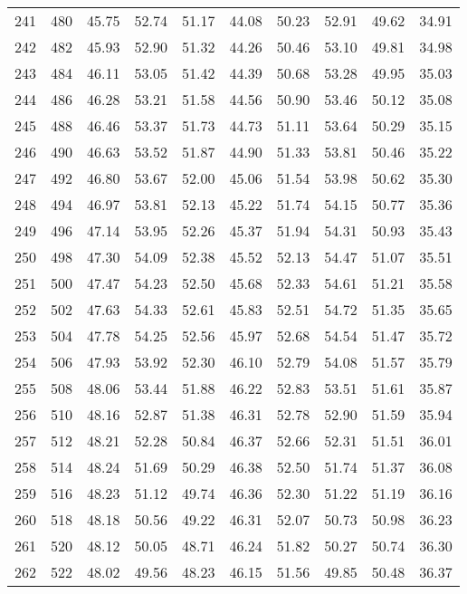 \begin{longtable}{rrllllllll}
		241 & 480 & 45.75 & 52.74 & 51.17 & 44.08 & 50.23 & 52.91 & 49.62 & 34.91 \\ 
		242 & 482 & 45.93 & 52.90 & 51.32 & 44.26 & 50.46 & 53.10 & 49.81 & 34.98 \\ 
		243 & 484 & 46.11 & 53.05 & 51.42 & 44.39 & 50.68 & 53.28 & 49.95 & 35.03 \\ 
		244 & 486 & 46.28 & 53.21 & 51.58 & 44.56 & 50.90 & 53.46 & 50.12 & 35.08 \\ 
		245 & 488 & 46.46 & 53.37 & 51.73 & 44.73 & 51.11 & 53.64 & 50.29 & 35.15 \\ 
		246 & 490 & 46.63 & 53.52 & 51.87 & 44.90 & 51.33 & 53.81 & 50.46 & 35.22 \\ 
		247 & 492 & 46.80 & 53.67 & 52.00 & 45.06 & 51.54 & 53.98 & 50.62 & 35.30 \\ 
		248 & 494 & 46.97 & 53.81 & 52.13 & 45.22 & 51.74 & 54.15 & 50.77 & 35.36 \\ 
		249 & 496 & 47.14 & 53.95 & 52.26 & 45.37 & 51.94 & 54.31 & 50.93 & 35.43 \\ 
		250 & 498 & 47.30 & 54.09 & 52.38 & 45.52 & 52.13 & 54.47 & 51.07 & 35.51 \\ 
		251 & 500 & 47.47 & 54.23 & 52.50 & 45.68 & 52.33 & 54.61 & 51.21 & 35.58 \\ 
		252 & 502 & 47.63 & 54.33 & 52.61 & 45.83 & 52.51 & 54.72 & 51.35 & 35.65 \\ 
		253 & 504 & 47.78 & 54.25 & 52.56 & 45.97 & 52.68 & 54.54 & 51.47 & 35.72 \\ 
		254 & 506 & 47.93 & 53.92 & 52.30 & 46.10 & 52.79 & 54.08 & 51.57 & 35.79 \\ 
		255 & 508 & 48.06 & 53.44 & 51.88 & 46.22 & 52.83 & 53.51 & 51.61 & 35.87 \\ 
		256 & 510 & 48.16 & 52.87 & 51.38 & 46.31 & 52.78 & 52.90 & 51.59 & 35.94 \\ 
		257 & 512 & 48.21 & 52.28 & 50.84 & 46.37 & 52.66 & 52.31 & 51.51 & 36.01 \\ 
		258 & 514 & 48.24 & 51.69 & 50.29 & 46.38 & 52.50 & 51.74 & 51.37 & 36.08 \\ 
		259 & 516 & 48.23 & 51.12 & 49.74 & 46.36 & 52.30 & 51.22 & 51.19 & 36.16 \\ 
		260 & 518 & 48.18 & 50.56 & 49.22 & 46.31 & 52.07 & 50.73 & 50.98 & 36.23 \\ 
		261 & 520 & 48.12 & 50.05 & 48.71 & 46.24 & 51.82 & 50.27 & 50.74 & 36.30 \\ 
		262 & 522 & 48.02 & 49.56 & 48.23 & 46.15 & 51.56 & 49.85 & 50.48 & 36.37 \\ 

\end{longtable}
